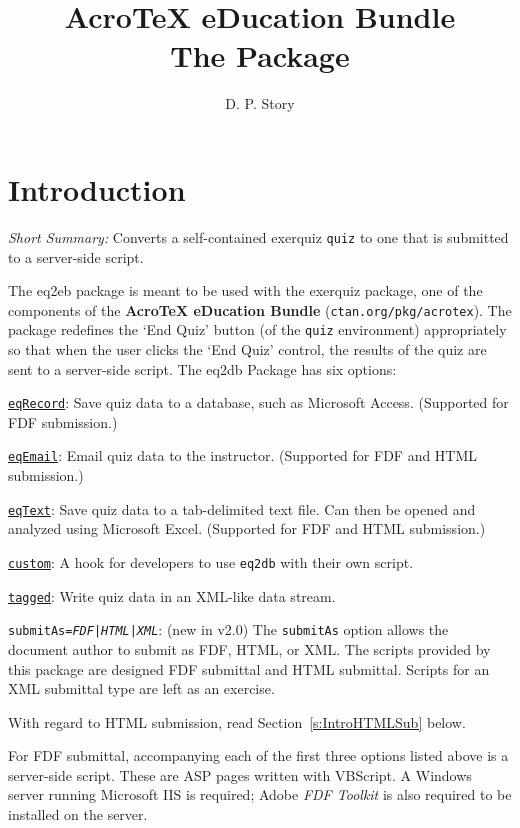 \documentclass{article}
\title{\texorpdfstring{Acro\!\TeX}{AcroTeX} eDucation Bundle\texorpdfstring{\\}{: }
    The \texorpdfstring{\pkg{eq2db}}{eq2db} Package}
\author{D. P. Story}
\makeatletter
\def\FitItIn{\eq@fititin}
\def\endredpoint{\FitItIn{{\large\ifusebw\color{black}\else\color{red}\fi$\blacktriangleleft$}}}
\def\meta#1{\textit{\texttt{#1}}}
\let\pkg\textsf
\let\env\texttt
\let\app\textsf
\makeatother
\begin{document}
\maketitle\tableofcontents

\section{Introduction}

\emph{Short Summary:} Converts a self-contained \pkg{exerquiz} \env{quiz} to one that is
submitted to a server-side script.\endredpoint

\medskip
The \pkg{eq2eb} package is meant to be used with the \pkg{exerquiz} package,
one of the components of the \textbf{{Acro\!\TeX} eDucation Bundle}
(\texttt{ctan.org/pkg/acrotex}). The package redefines the `End Quiz' button
(of the \env{quiz} environment) appropriately so that when the user clicks
the `End Quiz' control, the results of the quiz are sent to a server-side
script. The \pkg{eq2db} Package has six options:
\begin{questions}
\item \texttt{\hyperref[eqRecordOption]{eqRecord}}: Save quiz data
    to a database, such as Microsoft Access. (Supported for FDF submission.)
\item \texttt{\hyperref[eqEmailOption]{eqEmail}}: Email quiz data
    to the instructor. (Supported for FDF and HTML submission.)
\item \texttt{\hyperref[eqTextOption]{eqText}}: Save quiz data
    to a tab-delimited text file. Can then be opened and analyzed
    using Microsoft Excel. (Supported for FDF and HTML submission.)
\item \texttt{\hyperref[customOption]{custom}}: A hook for developers
    to use \texttt{eq2db} with their own script.
\item \texttt{\hyperref[taggedOption]{tagged}}: Write quiz data in an XML-like
    data stream.
\item \texttt{submitAs=\meta{\upshape FDF|HTML|XML}}: (new in v2.0) The
    \texttt{submitAs} option allows the document author to submit as FDF,
    HTML, or XML. The scripts provided by this package are designed FDF
    submittal and HTML submittal. Scripts for an XML submittal type are left
    as an exercise.

    With regard to HTML submission, read Section~\ref{s:IntroHTMLSub} below.
\end{questions}

For FDF submittal, accompanying each of the first three options listed above
is a server-side script. These are ASP pages written with \app{VBScript}.
A \app{Windows} server running Microsoft IIS is required; Adobe \textsl{FDF Toolkit}
is also required to be installed on the server.
\end{document}
